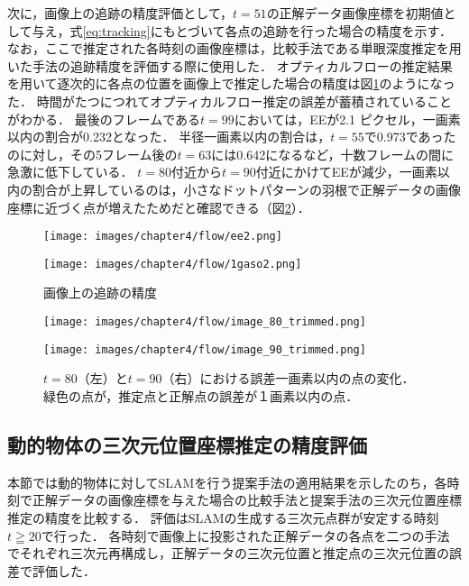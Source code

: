 次に，画像上の追跡の精度評価として，$t=51$の正解データ画像座標を初期値として与え，式\ref{eq:tracking}にもとづいて各点の追跡を行った場合の精度を示す．
なお，ここで推定された各時刻の画像座標は，比較手法である単眼深度推定を用いた手法の追跡精度を評価する際に使用した．
オプティカルフローの推定結果を用いて逐次的に各点の位置を画像上で推定した場合の精度は図\ref{fig:of_eval1}のようになった．
時間がたつにつれてオプティカルフロー推定の誤差が蓄積されていることがわかる．
最後のフレームである$t=99$においては，EEが2.1 ピクセル，一画素以内の割合が0.232となった．
半径一画素以内の割合は，$t=55$で0.973であったのに対し，その5フレーム後の$t=63$には0.642になるなど，十数フレームの間に急激に低下している．
$t=80$付近から$t=90$付近にかけてEEが減少，一画素以内の割合が上昇しているのは，小さなドットパターンの羽根で正解データの画像座標に近づく点が増えたためだと確認できる（図\ref{fig:t80-90}）．

\begin{figure}[H]
	\centering
	\begin{minipage}[b]{0.45\hsize}
		\centering
		\texttt{[image: images/chapter4/flow/ee2.png]}
		\label{fig:ee2}
	\end{minipage}
	\begin{minipage}[b]{0.45\hsize}
		\centering
		\texttt{[image: images/chapter4/flow/1gaso2.png]}
		\label{fig:1gaso2}
	\end{minipage}
	\caption{画像上の追跡の精度}
	\label{fig:of_eval1}
\end{figure}

\begin{figure}[H]
	\centering
	\begin{minipage}[b]{0.45\hsize}
		\centering
		\texttt{[image: images/chapter4/flow/image\_80\_trimmed.png]}
		\label{fig:t80}
	\end{minipage}
	\begin{minipage}[b]{0.45\hsize}
		\texttt{[image: images/chapter4/flow/image\_90\_trimmed.png]}
		\label{fig:t90}
	\end{minipage}
	\centering
	\caption[$t=80$と$t=90$における誤差一画素以内の点の変化]{$t=80$（左）と$t=90$（右）における誤差一画素以内の点の変化．緑色の点が，推定点と正解点の誤差が１画素以内の点．}
	\label{fig:t80-90}
\end{figure}

\subsection{動的物体の三次元位置座標推定の精度評価}\label{subsec:position_eval}
本節では動的物体に対してSLAMを行う提案手法の適用結果を示したのち，各時刻で正解データの画像座標を与えた場合の比較手法と提案手法の三次元位置座標推定の精度を比較する．
評価はSLAMの生成する三次元点群が安定する時刻$t\geqq{20}$で行った．
各時刻で画像上に投影された正解データの各点を二つの手法でそれぞれ三次元再構成し，正解データの三次元位置と推定点の三次元位置の誤差で評価した．

